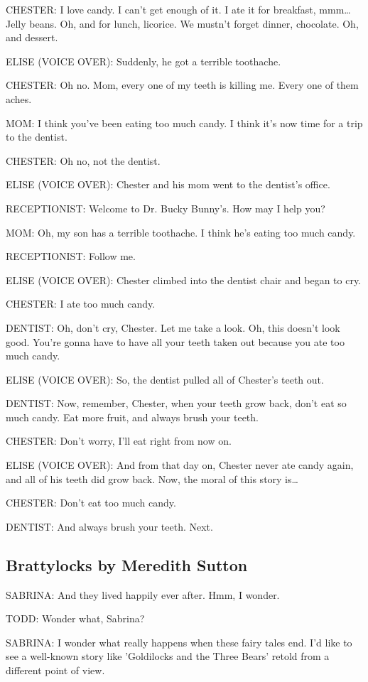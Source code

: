 CHESTER:
I love candy.
I can't get enough of it.
I ate it for breakfast, mmm\dots
Jelly beans.
Oh, and for lunch, licorice.
We mustn't forget dinner, chocolate.
Oh, and dessert.

ELISE (VOICE OVER):
Suddenly, he got a terrible toothache.

CHESTER:
Oh no.
Mom, every one of my teeth is killing me.
Every one of them aches.

MOM:
I think you've been eating too much candy.
I think it's now time for a trip to the dentist.

CHESTER:
Oh no, not the dentist.

ELISE (VOICE OVER):
Chester and his mom went to the dentist's office.

RECEPTIONIST:
Welcome to Dr. Bucky Bunny's.
How may I help you?

MOM:
Oh, my son has a terrible toothache.
I think he's eating too much candy.

RECEPTIONIST:
Follow me.

ELISE (VOICE OVER):
Chester climbed into the dentist chair and began to cry.

CHESTER:
I ate too much candy.

DENTIST:
Oh, don't cry, Chester.
Let me take a look.
Oh, this doesn't look good.
You're gonna have to have all your teeth taken out because you ate too much candy.

ELISE (VOICE OVER):
So, the dentist pulled all of Chester's teeth out.

DENTIST:
Now, remember, Chester, when your teeth grow back, don't eat so much candy.
Eat more fruit, and always brush your teeth.

CHESTER:
Don't worry, I'll eat right from now on.

ELISE (VOICE OVER):
And from that day on, Chester never ate candy again, and all of his teeth did grow back.
Now, the moral of this story is\dots

CHESTER:
Don't eat too much candy.

DENTIST:
And always brush your teeth.
Next.

\subsection{Brattylocks by Meredith Sutton}

SABRINA:
And they lived happily ever after.
Hmm, I wonder.

TODD:
Wonder what, Sabrina?

SABRINA:
I wonder what really happens when these fairy tales end.
I'd like to see a well-known story like 'Goldilocks and the Three Bears' retold from a different point of view.


